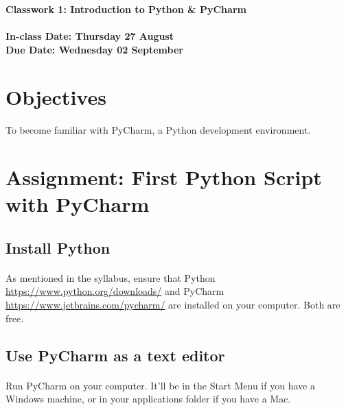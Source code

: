 \documentclass[letter,10pt]{article}
\begin{document}
    \huge
    \textbf{Classwork 1: Introduction to Python \& PyCharm}
    \normalsize
    \\ ~~ \\
    \textbf{In-class Date: Thursday 27 August} \\
    \textbf{Due Date: Wednesday 02 September}
    
    \section*{Objectives}
    \paragraph{}To become familiar with PyCharm, a Python development environment.
    
    \section*{Assignment: First Python Script with PyCharm}
    \subsection{Install Python}
    \paragraph{}As mentioned in the syllabus, ensure that Python \url{https://www.python.org/downloads/} and PyCharm \url{https://www.jetbrains.com/pycharm/} are installed on your computer. Both are free.
    
    \subsection{Use PyCharm as a text editor}
    \paragraph{}Run PyCharm on your computer. It'll be in the Start Menu if you have a Windows machine, or in your applications folder if you have a Mac.
    
\end{document}
